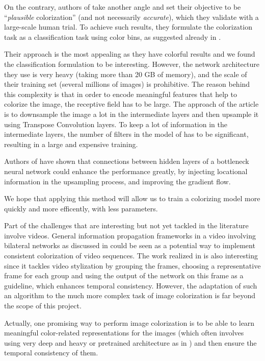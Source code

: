 \documentclass[10pt,twocolumn,letterpaper]{article}
\begin{document}
On the contrary, authors of \cite{zhang2016colorful} take another angle and set their objective to be ``\textit{plausible} colorization'' (and not necessarily \textit{accurate}), which they validate with a large-scale human trial. To achieve such results, they formulate the colorization task as a classification task using color bins, as suggested already in \cite{charpiat2008automatic}.

Their approach is the most appealing as they have colorful results and we found the classification formulation to be interesting. However, the network architecture they use is very heavy (taking more than 20 GB of memory), and the scale of their training set (several millions of images) is prohibitive. The reason behind this complexity is that in order to encode meaningful features that help to colorize the image, the receptive field has to be large. The approach of the article is to downsample the image a lot in the intermediate layers and then upsample it using Transpose Convolution layers. To keep a lot of information in the intermediate layers, the number of filters in the model of \cite{zhang2016colorful} has to be significant, resulting in a large and expensive training.

Authors of \cite{ronneberger2015unet} have shown that connections between hidden layers of a bottleneck neural network could enhance the performance greatly, by injecting locational information in the upsampling process, and improving the gradient flow.

We hope that applying this method will allow us to train a colorizing model more quickly and more efficently, with less parameters.

Part of the challenges that are interesting but not yet tackled in the literature involve videos. General information propagation frameworks in a video involving bilateral networks as discussed in \cite{jampani2017video} could be seen as a potential way to implement consistent colorization of video sequences. The work realized in \cite{zhu2017video} is also interesting since it tackles video stylization by grouping the frames, choosing a representative frame for each group and using the output of the network on this frame as a guideline, which enhances temporal consistency. However, the adaptation of such an algorithm to the much more complex task of image colorization is far beyond the scope of this project.

Actually, one promising way to perform image colorization is to be able to learn meaningful color-related representations for the images (which often involves using very deep and heavy or pretrained architecture as in \cite{larsson2016repres}) and then ensure the temporal consistency of them.
\end{document}
